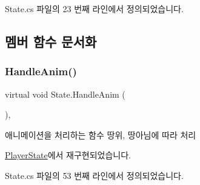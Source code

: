 State.\+cs 파일의 23 번째 라인에서 정의되었습니다.


\begin{DoxyCode}{0}

\end{DoxyCode}


\subsection{멤버 함수 문서화}
\mbox{\label{class_state_aa064ec6cd84d4a09b2c72a536125c74b}} 
\subsubsection{\texorpdfstring{HandleAnim()}{HandleAnim()}}
{\footnotesize\ttfamily virtual void State.\+Handle\+Anim (\begin{DoxyParamCaption}{ }\end{DoxyParamCaption})\hspace{0.3cm}{\ttfamily [protected]}, {\ttfamily [virtual]}}



애니메이션을 처리하는 함수\textquotesingle{} 땅위, 땅아님에 따라 처리 



\mbox{\hyperlink{class_player_state_ae57c0c11c946d701bb1e0eb2bc7204dd}{Player\+State}}에서 재구현되었습니다.



State.\+cs 파일의 53 번째 라인에서 정의되었습니다.


